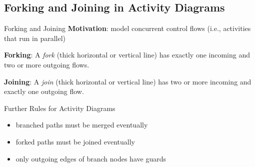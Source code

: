 \subsection{Forking and Joining in Activity Diagrams}
\begin{frame}{\insertsubsection}
	\begin{fancycolumns}[animation=none]
		\nextcolumn
		\begin{definition}{{Forking and Joining \mysource{\umluserguide}}}
			\textbf{Motivation}: model concurrent control flows (i.e., activities that run in parallel)
			
			\textbf{Forking}: A \emph{fork} (thick horizontal or vertical line) has exactly one incoming and two or more outgoing flows. 
			
			\textbf{Joining}: A \emph{join} (thick horizontal or vertical line) has two or more incoming and exactly one outgoing flow. 
		\end{definition}
		\pause
		\begin{note}{Further Rules for Activity Diagrams}
			\begin{itemize}
				\item branched paths must be merged eventually 
				\item forked paths must be joined eventually
				\item only outgoing edges of branch nodes have guards
			\end{itemize}
		\end{note}
	\end{fancycolumns}
\end{frame}


